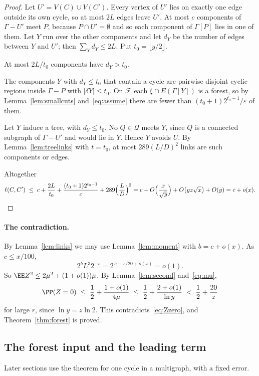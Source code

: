 \begin{proof}
Let $U'=V(C)\cup V(C')$. Every vertex of $U'$ lies on exactly one edge outside its own cycle, so at
most $2L$ edges leave $U'$. At most $c$ components of $\Gamma-U'$ meet $P$, because
$P\cap U'=\emptyset$ and so each component of $\Gamma[P]$ lies in one of them. Let $Y$ run over the
other components and let $d_Y$ be the number of edges between $Y$ and $U'$; then
$\sum_Yd_Y\le2L$. Put $t_0=\lfloor y/2\rfloor$.

 At most $2L/t_0$ components have $d_Y>t_0$.

 The components $Y$ with $d_Y\le t_0$ that contain a cycle are
pairwise disjoint cyclic regions inside $\Gamma-P$ with $|\delta Y|\le t_0$. On $\mathcal{F}$ each
$\xi\cap E(\Gamma[Y])$ is a forest, so by Lemma~\ref{lem:smallcuts} and~\eqref{eq:assume} there are
fewer than $(t_0+1)2^{t_0-1}/\varepsilon$ of them.

 Let $Y$ induce a tree, with $d_Y\le t_0$. No $Q\in\mathcal{Q}$ meets $Y$,
since $Q$ is a connected subgraph of $\Gamma-U'$ and would lie in $Y$. Hence $Y$ avoids $U$. By
Lemma~\ref{lem:treelinks} with $t=t_0$, at most $289(L/D)^{2}$ links are such components or edges.

Altogether
\[
  \ell(C,C')\;\le\;c+\frac{2L}{t_0}+\frac{(t_0+1)2^{t_0-1}}{\varepsilon}+289\Bigl(\frac{L}{D}\Bigr)^{2}
  =c+O\Bigl(\frac{x}{\sqrt y}\Bigr)+O\bigl(yz\sqrt x\bigr)+O(y)=c+o(x).\qedhere
\]
\end{proof}

\paragraph{The contradiction.}
By Lemma~\ref{lem:links} we may use Lemma~\ref{lem:moment} with $b=c+o(x)$. As $c\le x/100$,
\[
  2^{b}L^{3}2^{-s}=2^{\,c-x/20+o(x)}=o(1).
\]
So $\EE Z^{2}\le2\mu^{2}+(1+o(1))\mu$. By Lemma~\ref{lem:second} and~\eqref{eq:mu},
\[
  \PP(Z=0)\;\le\;\frac12+\frac{1+o(1)}{4\mu}\;\le\;\frac12+\frac{2+o(1)}{\ln y}\;<\;\frac12+\frac{20}{z}
\]
for large $r$, since $\ln y=z\ln2$. This contradicts~\eqref{eq:Zzero}, and
Theorem~\ref{thm:forest} is proved.

\subsection{The forest input and the leading term}\label{sec:leading}

Later sections use the theorem for one cycle in a multigraph, with a fixed error.

